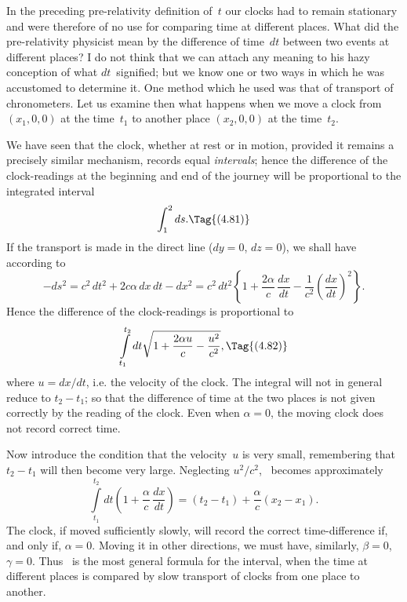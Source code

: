 \documentclass[12pt]{book}
\begin{document}
In the preceding pre\hyp{}relativity definition of~$t$ our clocks had to remain
stationary and were therefore of no use for comparing time at different places.
What did the pre\hyp{}relativity physicist mean by the difference of time~$dt$
between two events at different places? I do not think that we can attach
any meaning to his hazy conception of what $dt$~signified; but we know one
or two ways in which he was accustomed to determine it. One method which
he used was that of transport of chronometers. Let us examine then what
happens when we move a clock from $(x_1, 0, 0)$ at the time~$t_1$ to another place
%
%
$(x_2, 0, 0)$ at the time~$t_2$.

We have seen that the clock, whether at rest or in motion, provided it
remains a precisely similar mechanism, records equal \emph{intervals}; hence the
difference of the clock\hyp{}readings at the beginning and end of the journey will
be proportional to the integrated interval
\[
\int_{1}^{2} ds.
\Tag{(4.81)}
\]
If the transport is made in the direct line ($dy = 0$, $dz = 0$), we shall have
according to~
\[
-ds^2 = c^2\, dt^2 + 2c\alpha\, dx\, dt - dx^2 = c^2\, dt^2\left\{1 + \frac{2\alpha}{c}\, \frac{dx}{dt} - \frac{1}{c^2} \left(\frac{dx}{dt}\right)^{2}\right\}.
\]
Hence the difference of the clock\hyp{}readings  is proportional to
\[
\int\limits_{t_1}^{t_2} dt \sqrt{1 + \frac{2\alpha u}{c} - \frac{u^2}{c^2}},
\Tag{(4.82)}
\]
where $u = dx/dt$, i.e. the velocity of the clock. The integral will not in general
reduce to $t_{2} - t_{1}$; so that the difference of time at the two places is not given
correctly by the reading of the clock. Even when $\alpha = 0$, the moving clock
does not record correct time.

Now introduce the condition that the velocity~$u$ is very small, remembering
that $t_{2} - t_{1}$ will then become very large. Neglecting $u^2/c^2$, ~becomes approximately
\[
\int\limits_{t_1}^{t_2} dt \left(1 + \frac{\alpha}{c}\, \frac{dx}{dt}\right) = (t_2 - t_1) + \frac{\alpha}{c} (x_2 - x_1).
\]
The clock, if moved sufficiently slowly, will record the correct time\hyp{}difference
if, and only if, $\alpha = 0$. Moving it in other directions, we must have, similarly,
$\beta = 0$, $\gamma = 0$. Thus ~is the most general formula for the interval, when
the time at different places is compared by slow transport of clocks from one
%
place to another.
\end{document}
